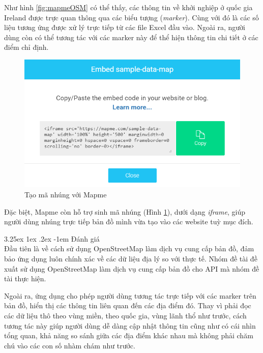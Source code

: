\documentclass[12pt,a4paper,twoside]{article}
\makeatletter
\newcommand{\myparagraph}[1]{\paragraph{#1}\mbox{}\\} %
\renewcommand\paragraph{\@startsection{paragraph}{5}{\z@}%
  {3.25ex \@plus1ex \@minus.2ex}%
  {-1em}%
  {\normalfont\normalsize\bfseries}}
\makeatother
\begin{document}
Như hình \ref{fig:mapmeOSM} có thể thấy, các thông tin về khởi nghiệp ở quốc gia Ireland được trực quan thông qua các biểu tượng (\textit{marker}). Cùng với đó là các số liệu tương ứng được xử lý trực tiếp từ các file Excel đầu vào.
Ngoài ra, người dùng còn có thể tương tác với các marker này để thể hiện thông tin chi tiết ở các điểm chỉ định.

\begin{figure}[!h]
	\begin{center}
    \includegraphics[scale=.8]{image/mapmeExport}
    \caption{Tạo mã nhúng với Mapme}
    \label{fig:mapmeExport}
	\end{center}
\end{figure}

Đặc biệt, Mapme còn hỗ trợ sinh mã nhúng (Hình \ref{fig:mapmeExport}), dưới dạng \textit{iframe}, giúp người dùng nhúng trực tiếp bản đồ mình vừa tạo vào các website tuỳ mục đích.

\myparagraph{Đánh giá}
Đầu tiên là về cách sử dụng OpenStreetMap làm dịch vụ cung cấp bản đồ, đảm bảo ứng dụng luôn chính xác về các dữ liệu địa lý so với thực tế. Nhóm đề tài đề xuất sử dụng OpenStreetMap làm dịch vụ cung cấp bản đồ cho API mà nhóm đề tài thực hiện.

Ngoài ra, ứng dụng cho phép người dùng tương tác trực tiếp với các marker trên bản đồ, hiển thị các thông tin liên quan đến các địa điểm đó. Thay vì phải đọc các dữ liệu thô theo vùng miền, theo quốc gia, vùng lãnh thổ như trước, cách tương tác này giúp người dùng dễ dàng cập nhật thông tin cũng như có cái nhìn tổng quan, khả năng so sánh giữa các địa điểm khác nhau mà không phải chăm chú vào các con số nhàm chám như trước.
\end{document}
